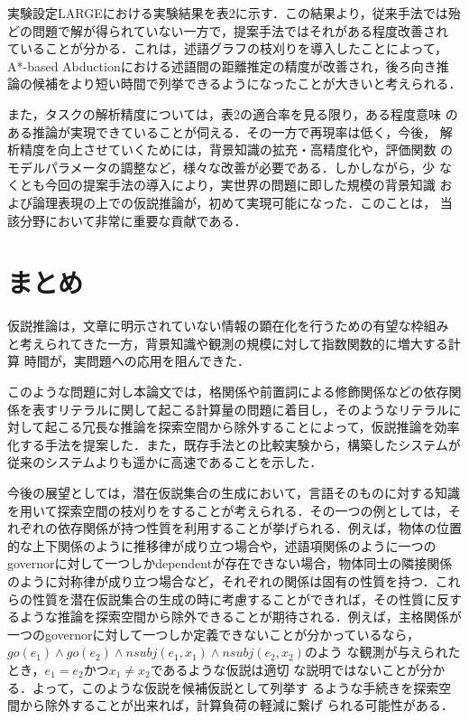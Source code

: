 \documentclass[japanese]{jnlp_1.4}
\begin{document}
実験設定LARGEにおける実験結果を表2に示す．この結果より，従来手法では殆
どの問題で解が得られていない一方で，提案手法ではそれがある程度改善され
ていることが分かる．これは，述語グラフの枝刈りを導入したことによって，
A*-based Abductionにおける述語間の距離推定の精度が改善され，後ろ向き推
論の候補をより短い時間で列挙できるようになったことが大きいと考えられる．

\begin{table}[t]
\label{tab:result-2}

\end{table}

また，タスクの解析精度については，表2の適合率を見る限り，ある程度意味
のある推論が実現できていることが伺える．その一方で再現率は低く，今後，
解析精度を向上させていくためには，背景知識の拡充・高精度化や，評価関数
のモデルパラメータの調整など，様々な改善が必要である．しかしながら，少
なくとも今回の提案手法の導入により，実世界の問題に即した規模の背景知識
および論理表現の上での仮説推論が，初めて実現可能になった．このことは，
当該分野において非常に重要な貢献である．



\section{まとめ}

仮説推論は，文章に明示されていない情報の顕在化を行うための有望な枠組み
と考えられてきた一方，背景知識や観測の規模に対して指数関数的に増大する計算
時間が，実問題への応用を阻んできた．

このような問題に対し本論文では，格関係や前置詞による修飾関係などの依存関
係を表すリテラルに関して起こる計算量の問題に着目し，そのようなリテラルに
対して起こる冗長な推論を探索空間から除外することによって，仮説推論を効率
化する手法を提案した．また，既存手法との比較実験から，構築したシステムが
従来のシステムよりも遥かに高速であることを示した．

今後の展望としては，潜在仮説集合の生成において，言語そのものに対する知識
を用いて探索空間の枝刈りをすることが考えられる．その一つの例としては，そ
れぞれの依存関係が持つ性質を利用することが挙げられる．例えば，物体の位置
的な上下関係のように推移律が成り立つ場合や，述語項関係のように一つの
governorに対して一つしかdependentが存在できない場合，物体同士の隣接関係
のように対称律が成り立つ場合など，それぞれの関係は固有の性質を持つ．これ
らの性質を潜在仮説集合の生成の時に考慮することができれば，その性質に反す
るような推論を探索空間から除外できることが期待される．例えば，主格関係が
一つのgovernorに対して一つしか定義できないことが分かっているなら，
$\mathit{go}(e_1) \land \mathit{go}(e_2) \land \mathit{nsubj}(e_1,x_1) \land \mathit{nsubj}(e_2,x_2)$のよう
な観測が与えられたとき，$e_1=e_2$かつ$x_1 \ne x_2$であるような仮説は適切
な説明ではないことが分かる．よって，このような仮説を候補仮説として列挙す
るような手続きを探索空間から除外することが出来れば，計算負荷の軽減に繋げ
られる可能性がある．
\end{document}

